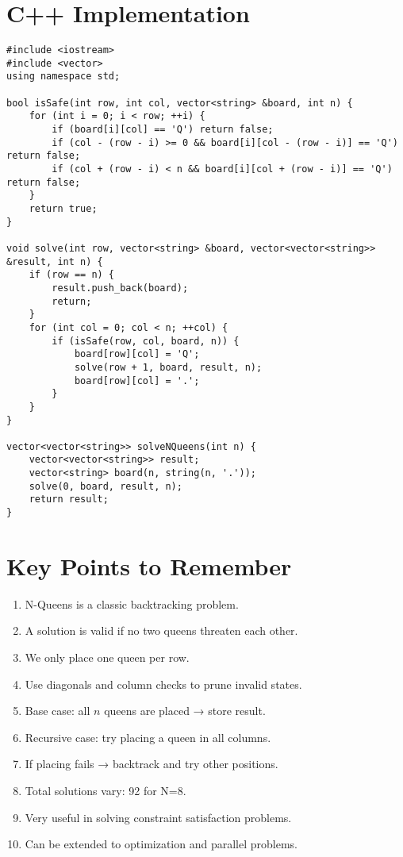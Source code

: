 \documentclass[14pt]{extarticle}
\begin{document}
\section{C++ Implementation}
\begin{lstlisting}[style=cpp, caption={N-Queens in C++}]
#include <iostream>
#include <vector>
using namespace std;

bool isSafe(int row, int col, vector<string> &board, int n) {
    for (int i = 0; i < row; ++i) {
        if (board[i][col] == 'Q') return false;
        if (col - (row - i) >= 0 && board[i][col - (row - i)] == 'Q') return false;
        if (col + (row - i) < n && board[i][col + (row - i)] == 'Q') return false;
    }
    return true;
}

void solve(int row, vector<string> &board, vector<vector<string>> &result, int n) {
    if (row == n) {
        result.push_back(board);
        return;
    }
    for (int col = 0; col < n; ++col) {
        if (isSafe(row, col, board, n)) {
            board[row][col] = 'Q';
            solve(row + 1, board, result, n);
            board[row][col] = '.';
        }
    }
}

vector<vector<string>> solveNQueens(int n) {
    vector<vector<string>> result;
    vector<string> board(n, string(n, '.'));
    solve(0, board, result, n);
    return result;
}
\end{lstlisting}

\newpage
\section{Key Points to Remember}
\begin{enumerate}
    \item N-Queens is a classic backtracking problem.
    \item A solution is valid if no two queens threaten each other.
    \item We only place one queen per row.
    \item Use diagonals and column checks to prune invalid states.
    \item Base case: all $n$ queens are placed → store result.
    \item Recursive case: try placing a queen in all columns.
    \item If placing fails → backtrack and try other positions.
    \item Total solutions vary: 92 for N=8.
    \item Very useful in solving constraint satisfaction problems.
    \item Can be extended to optimization and parallel problems.
\end{enumerate}
\end{document}
